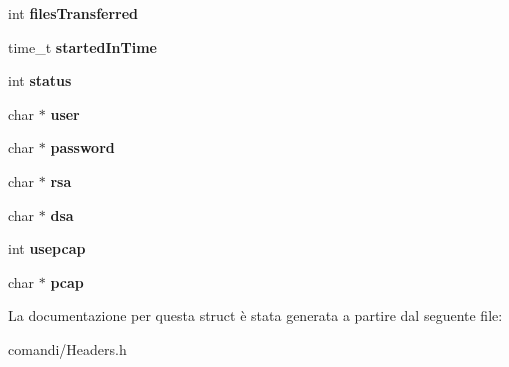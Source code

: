 \begin{DoxyCompactItemize}
\item 
int {\bfseries files\+Transferred}\hypertarget{struct____attribute_____a1b6abbcd74a6b89dabf679b2460b90ac}{}\label{struct____attribute_____a1b6abbcd74a6b89dabf679b2460b90ac}

\item 
time\+\_\+t {\bfseries started\+In\+Time}\hypertarget{struct____attribute_____ac3b6c3e36f5c609acf7c77a1eb921c9d}{}\label{struct____attribute_____ac3b6c3e36f5c609acf7c77a1eb921c9d}

\item 
int {\bfseries status}\hypertarget{struct____attribute_____a125027509765b665b98fed8d9de0848d}{}\label{struct____attribute_____a125027509765b665b98fed8d9de0848d}

\item 
char $\ast$ {\bfseries user}\hypertarget{struct____attribute_____a563a49366d8db439fad10a4400c3e9d2}{}\label{struct____attribute_____a563a49366d8db439fad10a4400c3e9d2}

\item 
char $\ast$ {\bfseries password}\hypertarget{struct____attribute_____a244f803edc2486294e7cd836174b50ce}{}\label{struct____attribute_____a244f803edc2486294e7cd836174b50ce}

\item 
char $\ast$ {\bfseries rsa}\hypertarget{struct____attribute_____aa3707a3beb1a96f1dc33cccdf96d15f2}{}\label{struct____attribute_____aa3707a3beb1a96f1dc33cccdf96d15f2}

\item 
char $\ast$ {\bfseries dsa}\hypertarget{struct____attribute_____aeac71771c3b85fd9f40150914b5892be}{}\label{struct____attribute_____aeac71771c3b85fd9f40150914b5892be}

\item 
int {\bfseries usepcap}\hypertarget{struct____attribute_____a6fccd4e2bb45a0ed006c9a737d8d687d}{}\label{struct____attribute_____a6fccd4e2bb45a0ed006c9a737d8d687d}

\item 
char $\ast$ {\bfseries pcap}\hypertarget{struct____attribute_____a3717a2fe0dc676aeb81cd32c164645ca}{}\label{struct____attribute_____a3717a2fe0dc676aeb81cd32c164645ca}

\end{DoxyCompactItemize}


La documentazione per questa struct è stata generata a partire dal seguente file\+:\begin{DoxyCompactItemize}
\item 
comandi/Headers.\+h\end{DoxyCompactItemize}

